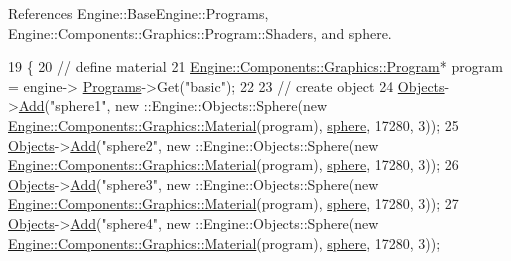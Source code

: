References Engine\+::\+Base\+Engine\+::\+Programs, Engine\+::\+Components\+::\+Graphics\+::\+Program\+::\+Shaders, and sphere.


\begin{DoxyCode}
19 \{
20     \textcolor{comment}{// define material}
21     \mbox{\hyperlink{classEngine_1_1Components_1_1Graphics_1_1Program}{Engine::Components::Graphics::Program}}* program = engine->
      \mbox{\hyperlink{classEngine_1_1BaseEngine_ae0f86360ea3a384caefe443dd8f88601}{Programs}}->Get(\textcolor{stringliteral}{"basic"});
22 
23     \textcolor{comment}{// create object}
24     \mbox{\hyperlink{classEngine_1_1Components_1_1Scene_a23481feabaaa56bf5613765db03af4da}{Objects}}->\mbox{\hyperlink{classGeneric_1_1Dictionary_ae7cb006f801b21c172e8fbac8794fa99}{Add}}(\textcolor{stringliteral}{"sphere1"}, new ::Engine::Objects::Sphere(\textcolor{keyword}{new} 
      \mbox{\hyperlink{classEngine_1_1Components_1_1Graphics_1_1Material}{Engine::Components::Graphics::Material}}(program), 
      \mbox{\hyperlink{2_2sphere_8h_a3663362197033eb86a9dcecea5a9d25f}{sphere}}, 17280, 3));
25     \mbox{\hyperlink{classEngine_1_1Components_1_1Scene_a23481feabaaa56bf5613765db03af4da}{Objects}}->\mbox{\hyperlink{classGeneric_1_1Dictionary_ae7cb006f801b21c172e8fbac8794fa99}{Add}}(\textcolor{stringliteral}{"sphere2"}, new ::Engine::Objects::Sphere(\textcolor{keyword}{new} 
      \mbox{\hyperlink{classEngine_1_1Components_1_1Graphics_1_1Material}{Engine::Components::Graphics::Material}}(program), 
      \mbox{\hyperlink{2_2sphere_8h_a3663362197033eb86a9dcecea5a9d25f}{sphere}}, 17280, 3));
26     \mbox{\hyperlink{classEngine_1_1Components_1_1Scene_a23481feabaaa56bf5613765db03af4da}{Objects}}->\mbox{\hyperlink{classGeneric_1_1Dictionary_ae7cb006f801b21c172e8fbac8794fa99}{Add}}(\textcolor{stringliteral}{"sphere3"}, new ::Engine::Objects::Sphere(\textcolor{keyword}{new} 
      \mbox{\hyperlink{classEngine_1_1Components_1_1Graphics_1_1Material}{Engine::Components::Graphics::Material}}(program), 
      \mbox{\hyperlink{2_2sphere_8h_a3663362197033eb86a9dcecea5a9d25f}{sphere}}, 17280, 3));
27     \mbox{\hyperlink{classEngine_1_1Components_1_1Scene_a23481feabaaa56bf5613765db03af4da}{Objects}}->\mbox{\hyperlink{classGeneric_1_1Dictionary_ae7cb006f801b21c172e8fbac8794fa99}{Add}}(\textcolor{stringliteral}{"sphere4"}, new ::Engine::Objects::Sphere(\textcolor{keyword}{new} 
      \mbox{\hyperlink{classEngine_1_1Components_1_1Graphics_1_1Material}{Engine::Components::Graphics::Material}}(program), 
      \mbox{\hyperlink{2_2sphere_8h_a3663362197033eb86a9dcecea5a9d25f}{sphere}}, 17280, 3));

\end{DoxyCode}
